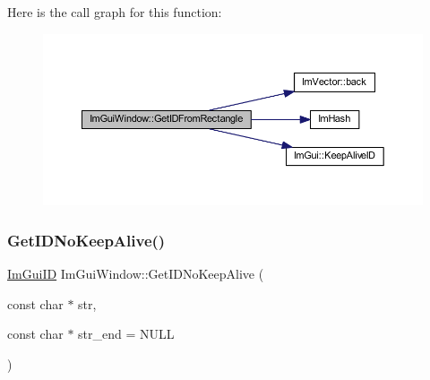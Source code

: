 Here is the call graph for this function\+:
\nopagebreak
\begin{figure}[H]
\begin{center}
\leavevmode
\includegraphics[width=350pt]{struct_im_gui_window_a44931b6e73248930490d2c89377a8233_cgraph}
\end{center}
\end{figure}
\mbox{\label{struct_im_gui_window_adc0a43f74a0b53a15a4bc4fea05524fe}} 
\subsubsection{\texorpdfstring{Get\+I\+D\+No\+Keep\+Alive()}{GetIDNoKeepAlive()}\hspace{0.1cm}{\footnotesize\ttfamily [1/2]}}
{\footnotesize\ttfamily \mbox{\hyperlink{imgui_8h_a1785c9b6f4e16406764a85f32582236f}{Im\+Gui\+ID}} Im\+Gui\+Window\+::\+Get\+I\+D\+No\+Keep\+Alive (\begin{DoxyParamCaption}\item[{const char $\ast$}]{str,  }\item[{const char $\ast$}]{str\+\_\+end = {\ttfamily NULL} }\end{DoxyParamCaption})}

